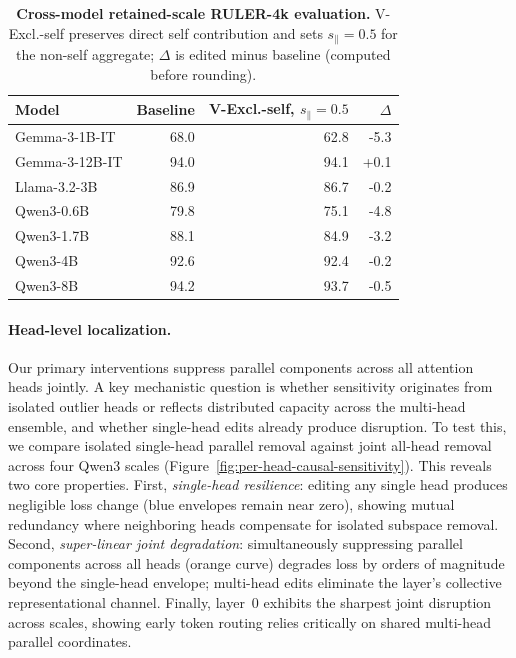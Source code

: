 \begin{table}[H]
  \vspace{-2pt}
  \centering
  \scriptsize
  \caption{\textbf{Cross-model retained-scale RULER-4k evaluation.}
  V-Excl.-self preserves direct self contribution and sets
  $s_{\parallel}=0.5$ for the non-self aggregate; \(\Delta\) is edited minus
  baseline (computed before rounding).}
  \label{tab:appendix-ruler-full}
  \setlength{\tabcolsep}{4.5pt}
  \renewcommand{\arraystretch}{0.96}
  \begin{tabular}{lrrr}
    \toprule
    Model & Baseline & V-Excl.-self, \(s_\parallel{=}0.5\) & \(\Delta\) \\
    \midrule
    Gemma-3-1B-IT & 68.0 & 62.8 & -5.3 \\
    Gemma-3-12B-IT & 94.0 & 94.1 & +0.1 \\
    Llama-3.2-3B & 86.9 & 86.7 & -0.2 \\
    Qwen3-0.6B & 79.8 & 75.1 & -4.8 \\
    Qwen3-1.7B & 88.1 & 84.9 & -3.2 \\
    Qwen3-4B & 92.6 & 92.4 & -0.2 \\
    Qwen3-8B & 94.2 & 93.7 & -0.5 \\
    \bottomrule
  \end{tabular}
  \vspace{-2pt}
\end{table}

\paragraph{Head-level localization.}
\label{app:head-localization}
Our primary interventions suppress parallel components across all attention heads jointly.
A key mechanistic question is whether sensitivity originates from isolated outlier heads or reflects distributed capacity across the multi-head ensemble, and whether single-head edits already produce disruption.
To test this, we compare isolated single-head parallel removal against joint all-head removal across four Qwen3 scales (Figure~\ref{fig:per-head-causal-sensitivity}).
This reveals two core properties. First, \textit{single-head resilience}: editing any single head produces negligible loss change (blue envelopes remain near zero), showing mutual redundancy where neighboring heads compensate for isolated subspace removal. Second, \textit{super-linear joint degradation}: simultaneously suppressing parallel components across all heads (orange curve) degrades loss by orders of magnitude beyond the single-head envelope; multi-head edits eliminate the layer's collective representational channel.
Finally, layer~0 exhibits the sharpest joint disruption across scales, showing early token routing relies critically on shared multi-head parallel coordinates.

